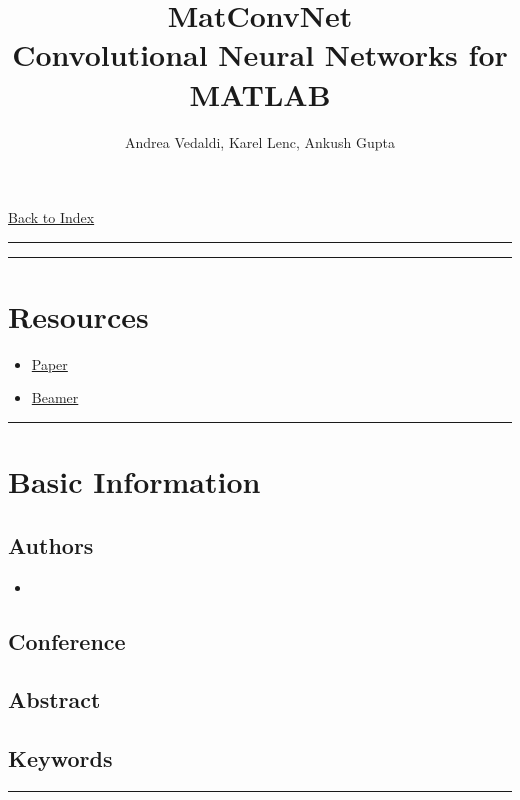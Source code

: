 \documentclass[letterpaper,10pt]{article}
\title{\textbf{MatConvNet\\Convolutional Neural Networks for MATLAB}}
\author{Andrea Vedaldi, Karel Lenc, Ankush Gupta}
\newcommand{\panhline}{\begin{center}\rule{\textwidth}{1pt}\end{center}}
\begin{document}
\maketitle

\href{../index.html}{Back to Index}
\panhline

\tableofcontents

\panhline
\section{Resources}

\begin{itemize}

	\item \href{./paper.pdf}{Paper}

	\item \href{./beamer.pdf}{Beamer}

\end{itemize}


\panhline
\section{Basic Information}


\subsection{Authors}

\begin{itemize}

	\item 

\end{itemize}


\subsection{Conference}

\subsection{Abstract}

\subsection{Keywords}

\panhline
\end{document}
